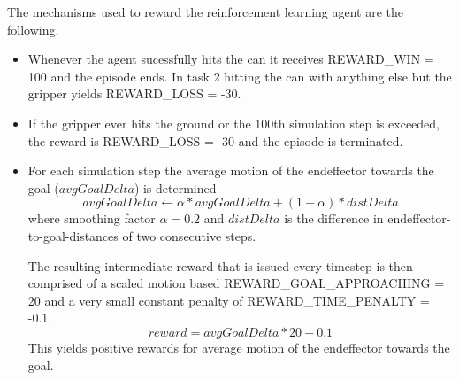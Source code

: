 \documentclass[10pt,journal,compsoc]{IEEEtran}
\begin{document}
The mechanisms used to reward the reinforcement learning agent are the following.
\begin{itemize}

    \item Whenever the agent sucessfully hits the can it receives REWARD\_WIN = 100 and the episode ends. In task 2 hitting the can with anything else but the gripper yields REWARD\_LOSS = -30.

    \item If the gripper ever hits the ground or the 100th simulation step is exceeded, the reward is REWARD\_LOSS = -30 and the episode is terminated.

    \item For each simulation step the average motion of the endeffector towards the goal ($avgGoalDelta$) is determined
    $$ avgGoalDelta \leftarrow \alpha * avgGoalDelta + (1 - \alpha) * distDelta $$
    where smoothing factor $\alpha = 0.2$ and $distDelta$ is the difference in endeffector-to-goal-distances of two consecutive steps.

    The resulting intermediate reward  that is issued every timestep is then comprised of a scaled motion based REWARD\_GOAL\_APPROACHING = 20 and a very small constant penalty of REWARD\_TIME\_PENALTY = -0.1.
    $$ reward = avgGoalDelta * 20 - 0.1 $$
    This yields positive rewards for average motion of the endeffector towards the goal.

\end{itemize}
\end{document}

